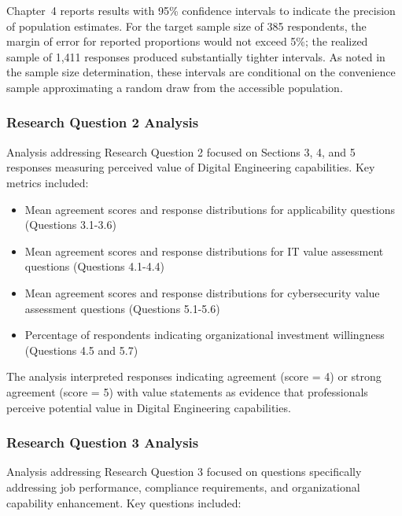 Chapter~4 reports results with 95\% confidence intervals to indicate the precision of population estimates. For the target sample size of 385 respondents, the margin of error for reported proportions would not exceed 5\%; the realized sample of 1{,}411 responses produced substantially tighter intervals. As noted in the sample size determination, these intervals are conditional on the convenience sample approximating a random draw from the accessible population.

\subsubsection{Research Question 2 Analysis}

Analysis addressing Research Question 2 focused on Sections 3, 4, and 5 responses measuring perceived value of Digital Engineering capabilities. Key metrics included:

\begin{itemize}
  \item Mean agreement scores and response distributions for applicability questions (Questions 3.1-3.6)
  \item Mean agreement scores and response distributions for IT value assessment questions (Questions 4.1-4.4)
  \item Mean agreement scores and response distributions for cybersecurity value assessment questions (Questions 5.1-5.6)
  \item Percentage of respondents indicating organizational investment willingness (Questions 4.5 and 5.7)
\end{itemize}

The analysis interpreted responses indicating agreement (score = 4) or strong agreement (score = 5) with value statements as evidence that professionals perceive potential value in Digital Engineering capabilities.

\subsubsection{Research Question 3 Analysis}

Analysis addressing Research Question 3 focused on questions specifically addressing job performance, compliance requirements, and organizational capability enhancement. Key questions included:

